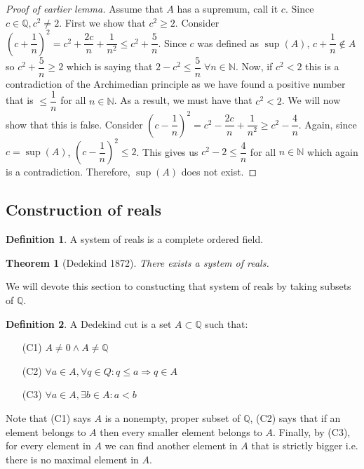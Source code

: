\documentclass{article}
\newcommand\N{\ensuremath{\mathbb{N}}}
\newcommand\Q{\ensuremath{\mathbb{Q}}}
\newtheorem{theorem}{Theorem}[section]
\theoremstyle{definition}
\newtheorem{definition}{Definition}[subsection]
\theoremstyle{remark}
\theoremstyle{plain}
\begin{document}
\begin{proof}[Proof of earlier lemma]
    Assume that \(A\) has a supremum, call it \(c\). Since \(c \in \Q, c^2 \neq 2\).
    First we show that \(c^2 \geq 2\). Consider \(\left( c+ \dfrac{1}{n} \right)^2 = c^2 + \dfrac{2c}{n} + \dfrac{1}{n^2}
    \leq c^2 + \dfrac{5}{n}\). Since \(c\) was defined as \(\sup(A)\), \(c+\dfrac{1}{n} \notin A\) so \(c^2 + \dfrac{5}{n} \geq 2\) which is saying that
    \(2 - c^2 \leq \dfrac{5}{n} \; \forall n \in \N\). Now, if \(c^2 < 2\) this is a contradiction of the Archimedian principle as we have found a positive number
    that is \(\leq \dfrac{1}{n}\) for all \(n \in \N\). As a result, we must have that \(c^2 < 2\). We will now show that this is false. Consider \(\left( c - \dfrac{1}{n} \right)^2 = 
    c^2 - \dfrac{2c}{n} + \dfrac{1}{n^2} \geq c^2 - \dfrac{4}{n}\). Again, since \(c = \sup(A)\), \(\left( c- \dfrac{1}{n} \right)^2 \leq 2\). This gives us \(c^2 - 2 \leq \dfrac{4}{n}\) for all 
    \(n \in \N\) which again is a contradiction. Therefore, \(\sup(A)\) does not exist. 
\end{proof}

\subsection{Construction of reals}

\begin{definition}
    A system of reals is a complete ordered field.
\end{definition}

\begin{theorem}[Dedekind 1872]
    There exists a system of reals. 
\end{theorem}

We will devote this section to constucting that system of reals by taking subsets of \(\Q\).

\begin{definition}
    A Dedekind cut is a set \(A \subset \Q\) such that:
    \begin{enumerate}
        \item[(C1)] \(A \neq 0 \land A \neq \Q\)
        \item[(C2)] \(\forall a \in A, \forall q \in Q: q \leq a \Rightarrow q \in A\)
        \item[(C3)] \(\forall a \in A, \exists b \in A: a < b\)
    \end{enumerate}
    Note that (C1) says \(A\) is a nonempty, proper subset of \(\Q\), (C2) says that if an element belongs to \(A\) 
    then every smaller element belongs to \(A\). Finally, by (C3), for every element in \(A\) we can find another element in
    \(A\) that is strictly bigger i.e. there is no maximal element in \(A\).
\end{definition}
\end{document}
